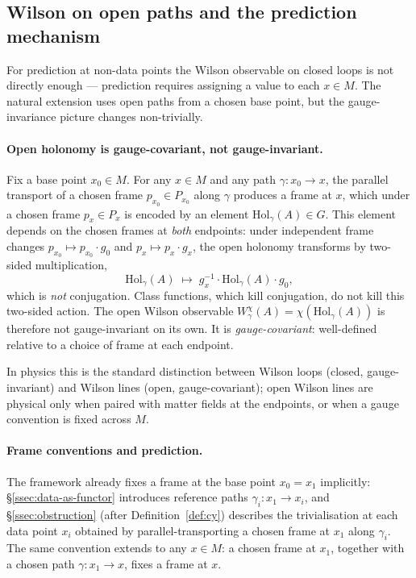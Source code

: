 \subsection{Wilson on open paths and the prediction mechanism}\label{ssec:open-paths}

For prediction at non-data points the Wilson observable on closed
loops is not directly enough --- prediction requires assigning a
value to each $x\in M$. The natural extension uses open paths from a
chosen base point, but the gauge-invariance picture changes
non-trivially.

\paragraph{Open holonomy is gauge-covariant, not gauge-invariant.}
Fix a base point $x_0\in M$. For any $x\in M$ and any path
$\gamma\colon x_0\to x$, the parallel transport of a chosen frame
$p_{x_0}\in P_{x_0}$ along $\gamma$ produces a frame at $x$, which
under a chosen frame $p_x\in P_x$ is encoded by an element
$\mathrm{Hol}_\gamma(A)\in G$. This element depends on the chosen
frames at \emph{both} endpoints: under independent frame changes
$p_{x_0}\mapsto p_{x_0}\cdot g_0$ and $p_x\mapsto p_x\cdot g_x$, the
open holonomy transforms by two-sided multiplication,
\[
   \mathrm{Hol}_\gamma(A) \;\mapsto\;
   g_x^{-1}\cdot\mathrm{Hol}_\gamma(A)\cdot g_0,
\]
which is \emph{not} conjugation. Class functions, which kill
conjugation, do not kill this two-sided action. The open Wilson
observable $W_\gamma^\chi(A)=\chi(\mathrm{Hol}_\gamma(A))$ is
therefore not gauge-invariant on its own. It is \emph{gauge-covariant}:
well-defined relative to a choice of frame at each endpoint.

In physics this is the standard distinction between Wilson loops
(closed, gauge-invariant) and Wilson lines (open, gauge-covariant);
open Wilson lines are physical only when paired with matter fields
at the endpoints, or when a gauge convention is fixed across $M$.

\paragraph{Frame conventions and prediction.} The framework already
fixes a frame at the base point $x_0=x_1$ implicitly: \S\ref{ssec:data-as-functor}
introduces reference paths $\gamma_i\colon x_1\to x_i$, and
\S\ref{ssec:obstruction} (after Definition~\ref{def:cy}) describes
the trivialisation at each data point $x_i$ obtained by
parallel-transporting a chosen frame at $x_1$ along $\gamma_i$. The
same convention extends to any $x\in M$: a chosen frame at $x_1$,
together with a chosen path $\gamma\colon x_1\to x$, fixes a frame
at $x$.

